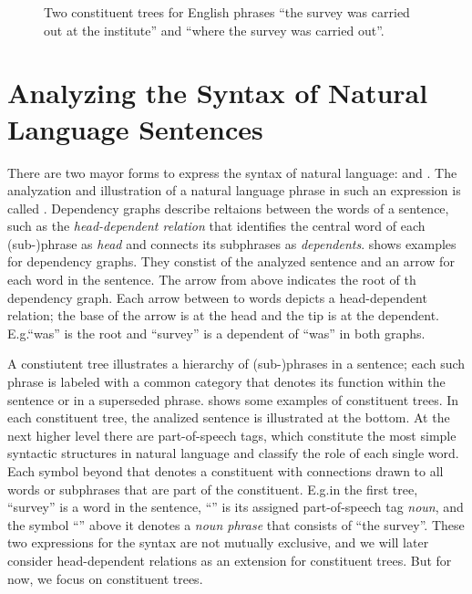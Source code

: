 \documentclass[../document.tex]{subfiles}
\begin{document}
    \begin{figure}
        \null\hfill
        
        \hfill
        
        \hfill\null
        \caption{\label{fig:constituent}
            Two constituent trees for English phrases ``the survey was carried out at the institute'' and ``where the survey was carried out''.
        }
    \end{figure}
    
    \section*{Analyzing the Syntax of Natural Language Sentences}
    There are two mayor forms to express the syntax of natural language:  and .
    The analyzation and illustration of a natural language phrase in such an expression is called .
    Dependency graphs describe reltaions between the words of a sentence, such as the \emph{head-dependent relation} that identifies the central word of each (sub-)phrase as \emph{head} and connects its subphrases as \emph{dependents}. \citep[Section 18.1]{Jur23}
     shows examples for dependency graphs.
    They constist of the analyzed sentence and an arrow for each word in the sentence.
    The arrow from above indicates the root of th dependency graph.
    Each arrow between to words depicts a head-dependent relation; the base of the arrow is at the head and the tip is at the dependent.
    E.g.\@ ``was'' is the root and ``survey'' is a dependent of ``was'' in both graphs. 
            
    A constiutent tree illustrates a hierarchy of (sub-)phrases in a sentence; each such phrase is labeled with a common category that denotes its function within the sentence or in a superseded phrase.
     shows some examples of constituent trees.
    In each constituent tree, the analized sentence is illustrated at the bottom.
    At the next higher level there are part-of-speech tags, which constitute the most simple syntactic structures in natural language and classify the role of each single word.
    Each symbol beyond that denotes a constituent with connections drawn to all words or subphrases that are part of the constituent.
    E.g.\@ in the first tree, ``survey'' is a word in the sentence, ``'' is its assigned part-of-speech tag \emph{noun}, and the symbol ``'' above it denotes a \emph{noun phrase} that consists of ``the survey''.
    These two expressions for the syntax are not mutually exclusive, and we will later consider head-dependent relations as an extension for constituent trees.
    But for now, we focus on constituent trees.
    
\end{document}

